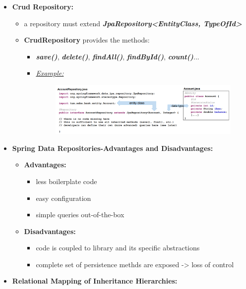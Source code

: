 \documentclass[ieeetran]{article}
\begin{document}
\begin{itemize}
\item \textbf{Crud Repository:}
\begin{itemize}
  \item a repository must extend \textit{\textbf{JpaRepository<EntityClass, TypeOfId>}}
\item \textbf{CrudRepository} provides the methods:
	\begin{itemize}
	  \item \textbf{\textit{save()}}, \textbf{\textit{delete()}}, \textbf{\textit{findAll()}}, \textbf{\textit{findById()}}, \textbf{\textit{count()}}...
	\item \textit{\underline{Example:}}
		\begin{figure}[h!]
		  \centering
		  \includegraphics[width=1.0\linewidth]{repospringdata.png}
		  \label{fig:repospringdata_png}
		\end{figure}
	\end{itemize}
\end{itemize}
\pagebreak
\item \textbf{Spring Data Repositories-Advantages and Disadvantages:}
	\begin{itemize}
	  \item \textbf{Advantages:}
		  \begin{itemize}
		    \item less boilerplate code
		\item easy configuration
			\item simple queries out-of-the-box
		  \end{itemize}

		\item \textbf{Disadvantages:}
			\begin{itemize}
			  \item code is coupled to library and its specific abstractions
				  \item complete set of persistence methds are exposed -> loss of control
			\end{itemize}
	\end{itemize}

\item \textbf{Relational Mapping of Inheritance Hierarchies:}


\end{itemize}
\end{document}
